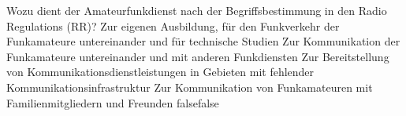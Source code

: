     {Wozu dient der Amateurfunkdienst nach der Begriffsbestimmung in den Radio Regulations (RR)?}
    {Zur eigenen Ausbildung, für den Funkverkehr der Funkamateure untereinander und für technische Studien}
    {Zur Kommunikation der Funkamateure untereinander und mit anderen Funkdiensten}
    {Zur Bereitstellung von Kommunikationsdienstleistungen in Gebieten mit fehlender Kommunikationsinfrastruktur}
    {Zur Kommunikation von Funkamateuren mit Familienmitgliedern und Freunden}
    {false}{false}